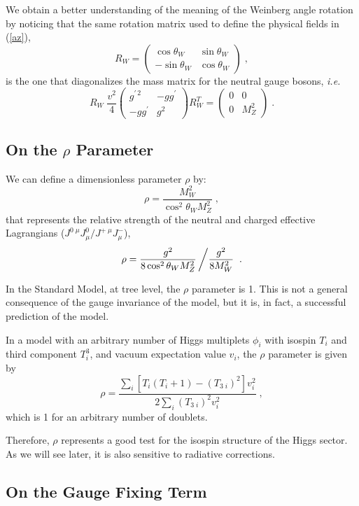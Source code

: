 \documentclass[12pt]{report}
\newcommand{\ba}{\begin{array}}
\newcommand{\ea}{\end{array}}
\begin{document}
We obtain a better understanding of the meaning of the Weinberg
angle rotation by noticing that the same rotation matrix used to
define the physical fields in (\ref{az}),
\[
R_W =
\left( \ba{cc}
\cos \theta_W & \sin\theta_W \\
-\sin\theta_W & \cos \theta_W
\ea \right) \; ,
\]
is the one that diagonalizes the mass matrix for the neutral gauge
bosons, {\it i.e.}
\[
R_W \; \frac{v^2}{4} \left( \ba{cc}
	      		g^{\prime \, 2}	& - g g^\prime \\
	          	- g g^\prime 	&  g^2
              		\ea \right) R_W^T = 
\left( \ba{cc}
	      	     0	& 0 \\
	             0 	& M_Z^2
              		\ea \right) \; .
\]


\subsection{On the $\rho$ Parameter}\indent

We can define a dimensionless parameter $\rho$ by:
\[
\rho = \frac{M_W^2}{\cos^2 \theta_W M_Z^2} \; ,
\]
that represents the relative strength of the neutral and charged
effective Lagrangians 
($J^{0 \; \mu} J^0_\mu/J^{+ \; \mu} J^-_\mu$),
\[
\rho = \frac{g^2}{8 \cos^2 \theta_W M_Z^2}\left/ \frac{g^2}{8
M_W^2}\right. \; .
\]

In the Standard Model, at tree level, the $\rho$ parameter is 1. This
is not a general consequence of the gauge invariance of the model, but
it is, in fact, a successful prediction of the model.

In a model with an arbitrary number of Higgs multiplets $\phi_i$
with isospin $T_i$ and third component $T_i^3$, and vacuum expectation
value $v_i$, the $\rho$ parameter is given by
\[
\rho = 
\frac{\sum_i \left[ T_i (T_i + 1) - (T_{3 \; i})^2 \right] v_i^2}{2 
\sum_i (T_{3 \; i})^2 v_i^2} \; ,
\]
which is 1 for an arbitrary number of doublets.

Therefore, $\rho$ represents a good test for the isospin structure of
the Higgs sector. As we will see later, it is also sensitive to
radiative corrections.


\subsection{On the Gauge Fixing Term} \indent 
\end{document}
